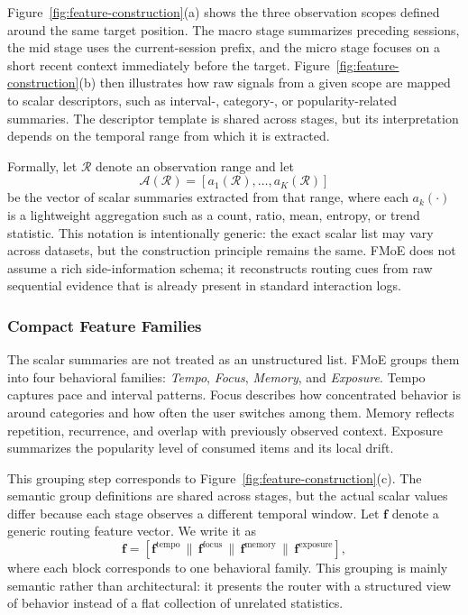 \documentclass[sigconf,authordraft]{acmart}
\begin{document}
Figure~\ref{fig:feature-construction}(a) shows the three observation scopes defined around the same target position. The macro stage summarizes preceding sessions, the mid stage uses the current-session prefix, and the micro stage focuses on a short recent context immediately before the target. Figure~\ref{fig:feature-construction}(b) then illustrates how raw signals from a given scope are mapped to scalar descriptors, such as interval-, category-, or popularity-related summaries. The descriptor template is shared across stages, but its interpretation depends on the temporal range from which it is extracted.

Formally, let $\mathcal{R}$ denote an observation range and let
\[
\mathcal{A}(\mathcal{R}) = [a_1(\mathcal{R}), \dots, a_K(\mathcal{R})]
\]
be the vector of scalar summaries extracted from that range, where each $a_k(\cdot)$ is a lightweight aggregation such as a count, ratio, mean, entropy, or trend statistic. This notation is intentionally generic: the exact scalar list may vary across datasets, but the construction principle remains the same. FMoE does not assume a rich side-information schema; it reconstructs routing cues from raw sequential evidence that is already present in standard interaction logs.

\subsubsection{Compact Feature Families}

The scalar summaries are not treated as an unstructured list. FMoE groups them into four behavioral families: \textit{Tempo}, \textit{Focus}, \textit{Memory}, and \textit{Exposure}. Tempo captures pace and interval patterns. Focus describes how concentrated behavior is around categories and how often the user switches among them. Memory reflects repetition, recurrence, and overlap with previously observed context. Exposure summarizes the popularity level of consumed items and its local drift.

This grouping step corresponds to Figure~\ref{fig:feature-construction}(c). The semantic group definitions are shared across stages, but the actual scalar values differ because each stage observes a different temporal window. Let $\mathbf{f}$ denote a generic routing feature vector. We write it as
\[
\mathbf{f}
=
[\mathbf{f}^{\mathrm{tempo}} \,\|\, \mathbf{f}^{\mathrm{focus}} \,\|\, \mathbf{f}^{\mathrm{memory}} \,\|\, \mathbf{f}^{\mathrm{exposure}}],
\]
where each block corresponds to one behavioral family. This grouping is mainly semantic rather than architectural: it presents the router with a structured view of behavior instead of a flat collection of unrelated statistics.
\end{document}
